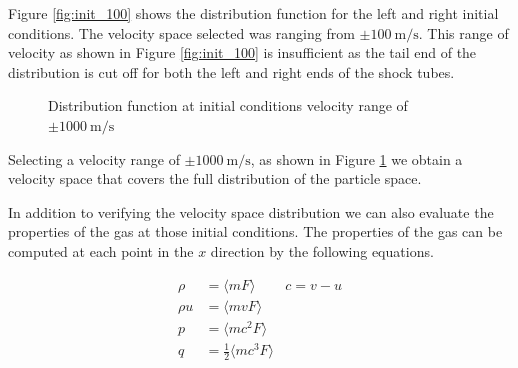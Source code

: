\documentclass[paper=a4, fontsize=12pt]{scrartcl}
\begin{document}
\noindent
Figure \ref{fig:init_100} shows the distribution function for the left and right initial conditions.
The velocity space selected was ranging from $\pm \SI{100}{\meter \per \second}$.
This range of velocity as shown in Figure \ref{fig:init_100} is insufficient as the tail
end of the distribution is cut off for both the left and right ends of the shock tubes.
\begin{figure}[H]
    \centering
    \qquad
    \caption{Distribution function at initial conditions \newline velocity range of $\pm \SI{1000}{\meter \per \second}$
 }
    \label{fig:init_1000}
\end{figure}

\noindent
Selecting a velocity range of $\pm \SI{1000}{\meter \per \second}$, as shown in Figure \ref{fig:init_1000} we obtain
a velocity space that covers the full distribution of the particle space.


In addition to verifying the velocity space distribution we can also evaluate the properties of the gas
at those initial conditions.
The properties of the gas can be computed at each point in the $x$ direction by the following equations.

\begin{align*}
        \rho &= \langle m F \rangle  &  c = v-u\\
        \rho u &= \langle m v F \rangle \\
        p &= \langle m c^2 F \rangle \\
        q &= \frac{1}{2}\langle m c^3 F \rangle \\
\end{align*}
\end{document}

